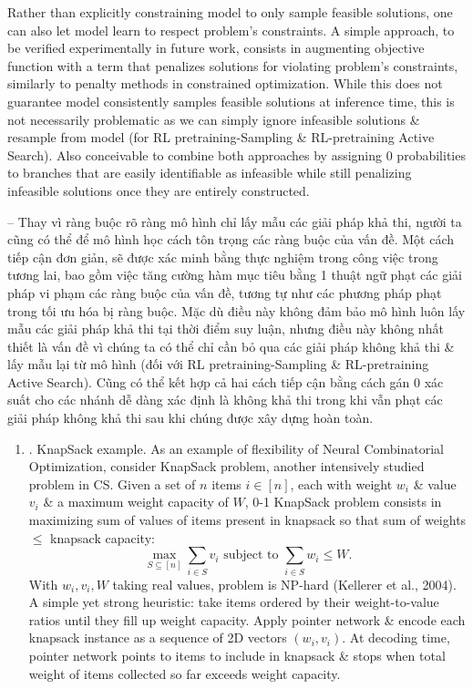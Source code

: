 \documentclass{article}
\begin{document}
\begin{itemize}
    Rather than explicitly constraining model to only sample feasible solutions, one can also let model learn to respect problem's constraints. A simple approach, to be verified experimentally in future work, consists in augmenting objective function with a term that penalizes solutions for violating problem's constraints, similarly to penalty methods in constrained optimization. While this does not guarantee model consistently samples feasible solutions at inference time, this is not necessarily problematic as we can simply ignore infeasible solutions \& resample from model (for RL pretraining-Sampling \& RL-pretraining Active Search). Also conceivable to combine both approaches by assigning 0 probabilities to branches that are easily identifiable as infeasible while still penalizing infeasible solutions once they are entirely constructed.
    
    -- Thay vì ràng buộc rõ ràng mô hình chỉ lấy mẫu các giải pháp khả thi, người ta cũng có thể để mô hình học cách tôn trọng các ràng buộc của vấn đề. Một cách tiếp cận đơn giản, sẽ được xác minh bằng thực nghiệm trong công việc trong tương lai, bao gồm việc tăng cường hàm mục tiêu bằng 1 thuật ngữ phạt các giải pháp vi phạm các ràng buộc của vấn đề, tương tự như các phương pháp phạt trong tối ưu hóa bị ràng buộc. Mặc dù điều này không đảm bảo mô hình luôn lấy mẫu các giải pháp khả thi tại thời điểm suy luận, nhưng điều này không nhất thiết là vấn đề vì chúng ta có thể chỉ cần bỏ qua các giải pháp không khả thi \& lấy mẫu lại từ mô hình (đối với RL pretraining-Sampling \& RL-pretraining Active Search). Cũng có thể kết hợp cả hai cách tiếp cận bằng cách gán 0 xác suất cho các nhánh dễ dàng xác định là không khả thi trong khi vẫn phạt các giải pháp không khả thi sau khi chúng được xây dựng hoàn toàn.
    \begin{enumerate}
        \item {. KnapSack example.} As an example of flexibility of Neural Combinatorial Optimization, consider KnapSack problem, another intensively studied problem in CS. Given a set of $n$ items $i\in[n]$, each with weight $w_i$ \& value $v_i$ \& a maximum weight capacity of $W$, 0-1 KnapSack problem consists in maximizing sum of values of items present in knapsack so that sum of weights $\le$ knapsack capacity:
        \begin{equation*}
            \max_{S\subseteq[n]} \sum_{i\in S} v_i\mbox{ subject to }\sum_{i\in S} w_i\le W.
        \end{equation*}
        With $w_i,v_i,W$ taking real values, problem is NP-hard (Kellerer et al., 2004). A simple yet strong heuristic: take items ordered by their weight-to-value ratios until they fill up weight capacity. Apply pointer network \& encode each knapsack instance as a sequence of 2D vectors $(w_i,v_i)$. At decoding time, pointer network points to items to include in knapsack \& stops when total weight of items collected so far exceeds weight capacity.
        

\end{enumerate}
\end{itemize}
\end{document}
